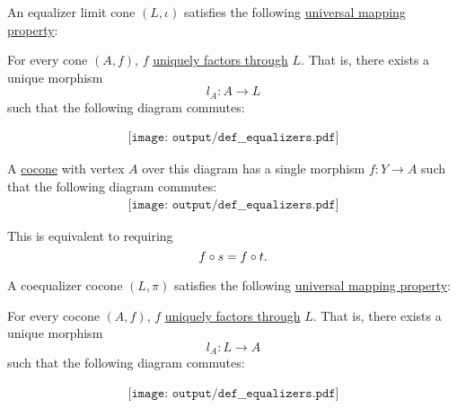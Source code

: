 \begin{definition}
\begin{minipage}[t]{0.47\textwidth}
    An equalizer limit cone \( (L, \iota) \) satisfies the following \hyperref[rem:limit_universal_mapping_property]{universal mapping property}:
    \begin{displayquote}
      For every cone \( (A, f) \), \( f \) \hyperref[def:factors_through]{uniquely factors through} \( L \). That is, there exists a unique morphism
      \begin{equation*}
         l_A: A \to L
      \end{equation*}
      such that the following diagram commutes:
    \end{displayquote}
    \begin{equation}\label{eq:def:equalizers/equalizer}
      \begin{aligned}
        \texttt{[image: output/def\_\_equalizers.pdf]}
      \end{aligned}
    \end{equation}
  \end{minipage}
  \hfill
  \begin{minipage}[t]{0.47\textwidth}
    A \hyperref[def:category_of_cones/cocone]{cocone} with vertex \( A \) over this diagram has a single morphism \( f: Y \to A \) such that the following diagram commutes:
    \begin{equation}\label{eq:def:equalizers/cocone}
      \begin{aligned}
        \texttt{[image: output/def\_\_equalizers.pdf]}
      \end{aligned}
    \end{equation}

    This is equivalent to requiring
    \begin{equation*}
      f \bincirc s = f \bincirc t.
    \end{equation*}

    A coequalizer cocone \( (L, \pi) \) satisfies the following \hyperref[rem:limit_universal_mapping_property]{universal mapping property}:
    \begin{displayquote}
      For every cocone \( (A, f) \), \( f \) \hyperref[def:factors_through]{uniquely factors through} \( L \). That is, there exists a unique morphism
      \begin{equation*}
        l_A: L \to A
      \end{equation*}
      such that the following diagram commutes:
    \end{displayquote}
    \begin{equation}\label{eq:def:equalizers/coequalizer}
      \begin{aligned}
        \texttt{[image: output/def\_\_equalizers.pdf]}
      \end{aligned}
    \end{equation}
  \end{minipage}


\end{definition}
